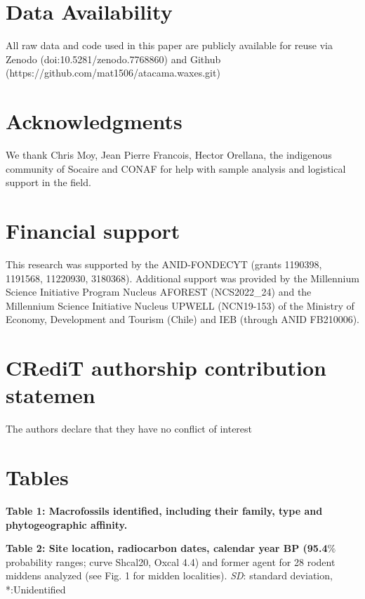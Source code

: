 \documentclass[
  authoryear,
  preprint,
  3p]{elsarticle}
\begin{document}
\hypertarget{data-availability}{%
\section{Data Availability}\label{data-availability}}

All raw data and code used in this paper are publicly available for
reuse via Zenodo (doi:10.5281/zenodo.7768860) and Github
(https://github.com/mat1506/atacama.waxes.git)

\hypertarget{acknowledgments}{%
\section{Acknowledgments}\label{acknowledgments}}

We thank Chris Moy, Jean Pierre Francois, Hector Orellana, the
indigenous community of Socaire and CONAF for help with sample analysis
and logistical support in the field.

\hypertarget{financial-support}{%
\section{Financial support}\label{financial-support}}

This research was supported by the ANID-FONDECYT (grants 1190398,
1191568, 11220930, 3180368). Additional support was provided by the
Millennium Science Initiative Program Nucleus AFOREST (NCS2022\_24) and
the Millennium Science Initiative Nucleus UPWELL (NCN19-153) of the
Ministry of Economy, Development and Tourism (Chile) and IEB (through
ANID FB210006).

\hypertarget{credit-authorship-contribution-statemen}{%
\section{CRediT authorship contribution
statemen}\label{credit-authorship-contribution-statemen}}

The authors declare that they have no conflict of interest

\newpage{}

\hypertarget{tables}{%
\section{Tables}\label{tables}}

\textbf{Table 1: Macrofossils identified, including their family, type
and phytogeographic affinity.}

\textbf{Table 2: Site location, radiocarbon dates, calendar year BP
(95.4}\(\%\) probability ranges; curve Shcal20, Oxcal 4.4) and former
agent for 28 rodent middens analyzed (see Fig. 1 for midden localities).
\emph{SD}: standard deviation, *:Unidentified

\newpage{}


\renewcommand\refname{References}
  
\end{document}
